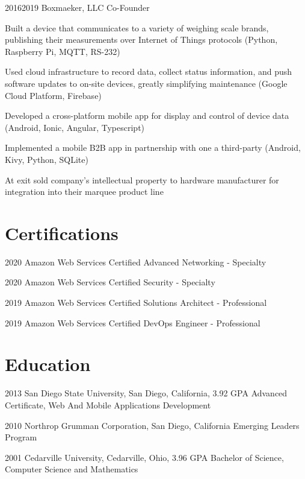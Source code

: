 \documentclass{article}
\begin{document}
\job
  {2016}{2019}
  {Boxmaeker, LLC}
  {Co-Founder}
  {\begin{achievements}
    \item Built a device that communicates to a variety of weighing scale brands, publishing their measurements over Internet of Things protocols (Python, Raspberry Pi, MQTT, RS-232)
    \item Used cloud infrastructure to record data, collect status information, and push software updates to on-site devices, greatly simplifying maintenance (Google Cloud Platform, Firebase)
    \item Developed a cross-platform mobile app for display and control of device data (Android, Ionic, Angular, Typescript)
    \item Implemented a mobile B2B app in partnership with one a third-party (Android, Kivy, Python, SQLite)
    \item At exit sold company's intellectual property to hardware manufacturer for integration into their marquee product line
  \end{achievements}}


\section{Certifications}

\education
  {2020}
  {Amazon Web Services}
  {Certified Advanced Networking - Specialty}

\education
  {2020}
  {Amazon Web Services}
  {Certified Security - Specialty}

\education
  {2019}
  {Amazon Web Services}
  {Certified Solutions Architect - Professional}

\education
  {2019}
  {Amazon Web Services}
  {Certified DevOps Engineer - Professional}


\section{Education}

\education
  {2013}
  {San Diego State University, San Diego, California, 3.92 GPA}
  {Advanced Certificate, Web And Mobile Applications Development}

\education
  {2010}
  {Northrop Grumman Corporation, San Diego, California}
  {Emerging Leaders Program}

\education
  {2001}
  {Cedarville University, Cedarville, Ohio, 3.96 GPA}
  {Bachelor of Science, Computer Science and Mathematics}


\section{}

\credits
\end{document}
